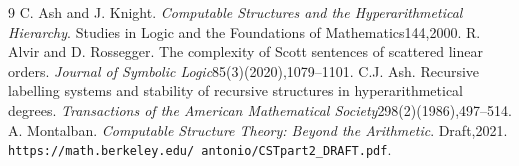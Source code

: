 \documentclass[10pt,a4paper]{amsart}
\begin{document}
\begin{thebibliography}{9}
 C. Ash and J. Knight. \emph{Computable Structures and the Hyperarithmetical Hierarchy}. Studies in Logic and the Foundations of Mathematics144,2000.
 R. Alvir and D. Rossegger. The complexity of Scott sentences of scattered linear orders. \emph{Journal of Symbolic Logic}85(3)(2020),1079--1101.
 C.J. Ash. Recursive labelling systems and stability of recursive structures in hyperarithmetical degrees. \emph{Transactions of the American Mathematical Society}298(2)(1986),497--514.
 A. Montalban. \emph{Computable Structure Theory: Beyond the Arithmetic}. Draft,2021. \texttt{https://math.berkeley.edu/\string~antonio/CSTpart2\_DRAFT.pdf}.
\end{thebibliography}
\end{document}
